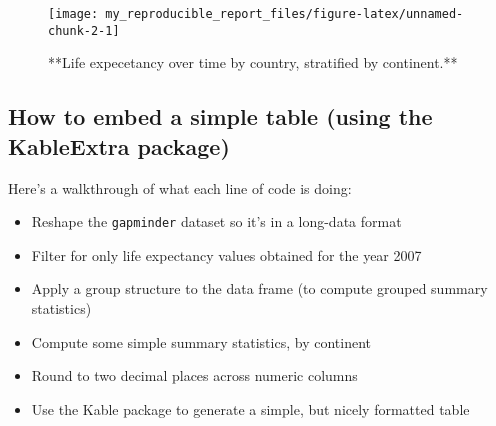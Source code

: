 \documentclass[
]{article}
\providecommand{\tightlist}{%
  \setlength{\itemsep}{0pt}\setlength{\parskip}{0pt}}
\begin{document}
\begin{figure}

{\centering \texttt{[image: my\_reproducible\_report\_files/figure-latex/unnamed-chunk-2-1]} 

}

\caption{**Life expecetancy over time by country, stratified by continent.**}\label{fig:unnamed-chunk-2}
\end{figure}

\hypertarget{how-to-embed-a-simple-table-using-the-kableextra-package}{%
\subsection{How to embed a simple table (using the KableExtra
package)}\label{how-to-embed-a-simple-table-using-the-kableextra-package}}

Here's a walkthrough of what each line of code is doing:

\begin{itemize}
\tightlist
\item
  Reshape the \texttt{gapminder} dataset so it's in a long-data format
\item
  Filter for only life expectancy values obtained for the year 2007
\item
  Apply a group structure to the data frame (to compute grouped summary
  statistics)
\item
  Compute some simple summary statistics, by continent
\item
  Round to two decimal places across numeric columns
\item
  Use the Kable package to generate a simple, but nicely formatted table
\end{itemize}
\end{document}
